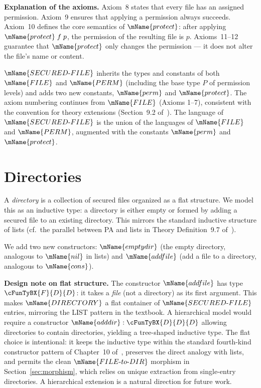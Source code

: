 \documentclass[11pt]{article}
\newcommand{\PERM}{\mName{PERM}}
\newcommand{\FILETYPE}{\mName{FILE}}
\newcommand{\SECFILE}{\mName{SECURED\text{-}FILE}}
\newcommand{\DIR}{\mName{DIRECTORY}}
\newcommand{\perm}{\mName{perm}}
\newcommand{\prot}{\mName{protect}}
\begin{document}
\medskip
\noindent\textbf{Explanation of the axioms.}
Axiom~8 states that every file has an assigned permission.
Axiom~9 ensures that applying a permission always succeeds.
Axiom~10 defines the core semantics of $\prot$: after applying
$\prot\;f\;p$, the permission of the resulting file is $p$.
Axioms~11--12 guarantee that $\prot$ only changes the permission
--- it does not alter the file's name or content.

$\SECFILE$ inherits the types and constants of both $\FILETYPE$
and $\PERM$ (including the base type $P$ of permission levels) and
adds two new constants, $\perm$ and $\prot$.  The axiom numbering
continues from $\FILETYPE$ (Axioms 1--7), consistent with the
convention for theory extensions (Section~9.2
of~\cite{farmer2025}).  The language of $\SECFILE$ is the union of
the languages of $\FILETYPE$ and $\PERM$, augmented with the
constants $\perm$ and $\prot$.

\newpage
\section{Directories}
\label{sec:dir}

A \emph{directory} is a collection of secured files organized as a
flat structure.  We model this as an inductive type: a directory is
either empty or formed by adding a secured file to an existing
directory.  This mirrors the standard inductive structure of lists
(cf.\ the parallel between PA and lists in Theory
Definition~9.7 of~\cite{farmer2025}).

We add two new constructors: $\mName{emptydir}$ (the empty
directory, analogous to $\mName{nil}$ in lists) and $\mName{addfile}$ (add
a file to a directory, analogous to $\mName{cons}$).

\medskip
\noindent\textbf{Design note on flat structure.}
The constructor $\mName{addfile}$ has type
$\cFunTyBX{F}{D}{D}$: it takes a \emph{file} (not a directory) as
its first argument.  This makes $\DIR$ a flat container of
$\SECFILE$ entries, mirroring the LIST pattern in the textbook.
A hierarchical model would require a constructor
$\mName{adddir} : \cFunTyBX{D}{D}{D}$ allowing directories to
contain directories, yielding a tree-shaped inductive type.  The
flat choice is intentional: it keeps the inductive type within the
standard fourth-kind constructor pattern of Chapter~10
of~\cite{farmer2025}, preserves the direct analogy with lists, and
permits the clean $\mName{FILE\text{-}to\text{-}DIR}$ morphism in
Section~\ref{sec:morphism}, which relies on unique extraction from
single-entry directories.  A hierarchical extension is a natural
direction for future work.
\end{document}
